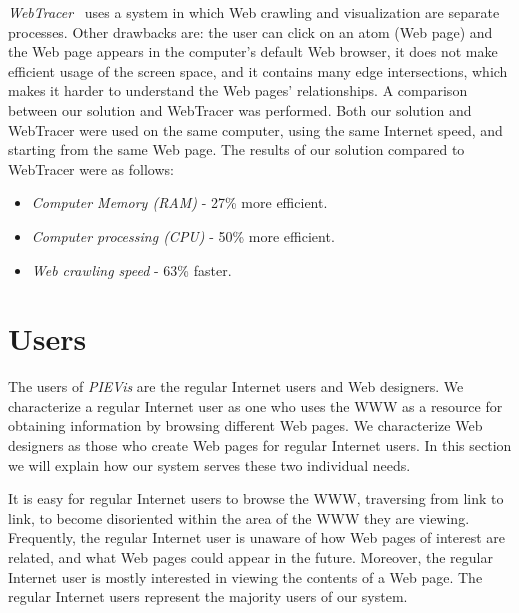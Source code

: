 \documentclass[]{article}
\begin{document}
{%
{\em WebTracer}~\cite{webtracer} uses a system in which Web crawling and visualization are separate processes.
Other drawbacks are: the user can click on an atom (Web page) and the Web page appears in the computer's default Web browser, it does not make efficient usage of the screen space, and it contains many edge intersections, which makes it harder to understand the Web pages' relationships.
A comparison between our solution and WebTracer was performed.
Both our solution and WebTracer were used on the same computer, using the same Internet speed, and starting from the same Web page.
The results of our solution compared to WebTracer were as follows:

\begin{itemize}

\item {{\em Computer Memory (RAM)} - 27\% more efficient.}

\item {{\em Computer processing (CPU)} - 50\% more efficient.}

\item {{\em Web crawling speed} - 63\% faster.}

\end{itemize}

\section{Users}
\label{se:users}

The users of {\em PIEVis} are the regular Internet users and Web designers.  We characterize a regular Internet user as one who uses the WWW as a resource for 
obtaining information by browsing different Web pages.  
We characterize Web designers as those who create Web pages for regular Internet users.  
In this section we will explain how our system serves these two individual needs.

It is easy for regular Internet users to browse the WWW, traversing from link to link, to become disoriented within the area of the WWW they are viewing.  
Frequently, the regular Internet user is unaware of how Web pages of interest are related, and what Web pages could appear in the future. 
Moreover, the regular Internet user is mostly interested in viewing the contents of a Web page.
The regular Internet users represent the majority users of our system.

}
\end{document}
